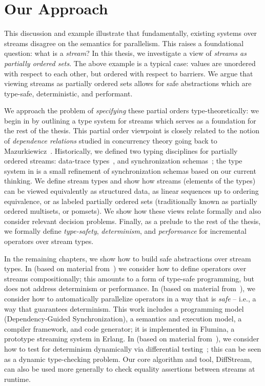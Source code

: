 \section{Our Approach}

This discussion and example illustrate that fundamentally, existing systems over streams disagree on the semantics for parallelism.
This raises a foundational question: what is a \emph{stream}?
In this thesis, we investigate a view of \emph{streams as partially ordered sets}.
The above example is a typical case: values are unordered with respect to each other, but ordered with respect to barriers.
We argue that viewing streams as partially ordered sets allows for safe abstractions which are type-safe, deterministic, and performant.

We approach the problem of \emph{specifying} these partial orders type-theoretically: we begin in  by
outlining a type system for streams which serves as a foundation for the rest of the thesis.
This partial order viewpoint is closely related to the notion of \emph{dependence relations} studied in concurrency theory going back to Mazurkiewicz~\cite{mazurkiewicz1986trace}.
Historically, we defined two typing disciplines for partially ordered streams:
data-trace types~,
and synchronization schemas~;
the type system in  is a small refinement of synchronization schemas based on our current thinking.
We define stream types and show how streams (elements of the types) can be viewed equivalently as structured data, as linear sequences up to ordering equivalence, or as labeled partially ordered sets (traditionally known as partially ordered multisets, or pomsets).
We show how these views relate formally and also consider relevant decision problems.
Finally, as a prelude to the rest of the thesis, we formally define \emph{type-safety}, \emph{determinism}, and \emph{performance} for incremental operators over stream types.

In the remaining chapters, we show how to build safe abstractions over stream types.
In  (based on material from~) we consider how to define operators over streams compositionally; this amounts to a form of type-safe programming, but does not address determinism or performance.
In  (based on material from~), we consider how to automatically parallelize operators in a way that is \emph{safe} -- i.e., a way that guarantees determinism. This work includes a programming model (Dependency-Guided Synchronization), a semantics and execution model, a compiler framework, and code generator; it is implemented in Flumina, a prototype streaming system in Erlang.
In  (based on material from~), we
consider how to test for determinism dynamically via differential testing~\cite{mckeeman1998differential}; this can be seen as a dynamic
type-checking problem. Our core algorithm and tool, DiffStream, can also be used more generally to check equality assertions between streams at runtime.

